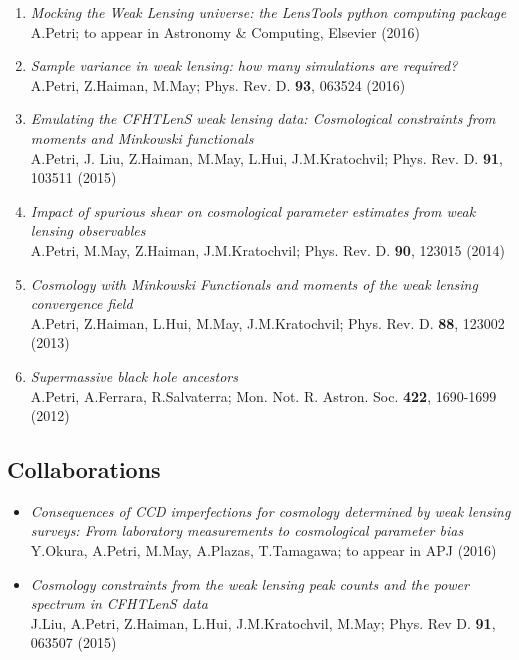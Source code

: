 \documentclass[margin]{res} %
\begin{document}
\begin{resume}
\begin{enumerate}
\item {\sl Mocking the Weak Lensing universe: the LensTools python computing package} \\
A.Petri; to appear in Astronomy \& Computing, Elsevier (2016)
\item {\sl Sample variance in weak lensing: how many simulations are required?} \\
A.Petri, Z.Haiman, M.May; Phys. Rev. D. \textbf{93}, 063524 (2016)
\item {\sl Emulating the CFHTLenS weak lensing data: Cosmological constraints from moments and Minkowski functionals} \\
A.Petri, J. Liu, Z.Haiman, M.May, L.Hui, J.M.Kratochvil; Phys. Rev. D. \textbf{91}, 103511 (2015)
\item {\sl Impact of spurious shear on cosmological parameter estimates from weak lensing observables} \\
A.Petri, M.May, Z.Haiman, J.M.Kratochvil; Phys. Rev. D. \textbf{90}, 123015 (2014)
\item {\sl Cosmology with Minkowski Functionals and moments of the weak lensing convergence field} \\
A.Petri, Z.Haiman, L.Hui, M.May, J.M.Kratochvil; Phys. Rev. D. \textbf{88}, 123002 (2013)
\item {\sl Supermassive black hole ancestors} \\
A.Petri, A.Ferrara, R.Salvaterra; Mon. Not. R. Astron. Soc. \textbf{422}, 1690-1699 (2012)

\end{enumerate}

\subsection{Collaborations}

\begin{itemize}
\item {\sl Consequences of CCD imperfections for cosmology determined by weak lensing surveys: From laboratory measurements to cosmological parameter bias} \\ 
Y.Okura, A.Petri, M.May, A.Plazas, T.Tamagawa; to appear in APJ (2016)
\item {\sl Cosmology constraints from the weak lensing peak counts and the power spectrum in CFHTLenS data} \\ 
J.Liu, A.Petri, Z.Haiman, L.Hui, J.M.Kratochvil, M.May; Phys. Rev D. \textbf{91}, 063507 (2015)
\end{itemize}


\end{resume}
\end{document}
